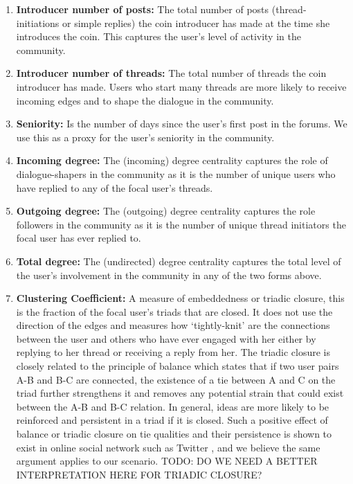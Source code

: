 \begin{enumerate}[topsep=0pt,itemsep=-0.5ex,partopsep=1ex,parsep=1ex]
  \item \textbf{Introducer number of posts:} The total number of posts (thread-initiations or simple replies) the coin introducer has made at the time she introduces the coin. This captures the user's level of activity in the community.
  \item \textbf{Introducer number of threads:} The total number of threads the coin introducer has made. Users who start many threads are more likely to receive incoming edges and to shape the dialogue in the community.
  \item \textbf{Seniority:} Is the number of days since the user's first post in the forums. We use this as a proxy for the user's seniority in the community.
  \item \textbf{Incoming degree:} The (incoming) degree centrality captures the role of dialogue-shapers in the community as it is the number of unique users who have replied to any of the focal user's threads.
  \item \textbf{Outgoing degree:} The (outgoing) degree centrality captures the role followers in the community as it is the number of unique thread initiators the focal user has ever replied to.
  \item \textbf{Total degree:} The (undirected) degree centrality captures the total level of the user's involvement in the community in any of the two forms above.
  \item \textbf{Clustering Coefficient:} A measure of embeddedness or triadic closure, this is the fraction of the focal user's triads that are closed. It does not use the direction of the edges and measures how `tightly-knit' are the connections between the user and others who have ever engaged with her either by replying to her thread or receiving a reply from her. The triadic closure is closely related to the principle of balance which states that if two user pairs A-B and B-C are connected, the existence of a tie between A and C on the triad further strengthens it and removes any potential strain that could exist between the A-B and B-C relation. In general, ideas are more likely to be reinforced and persistent in a triad if it is closed. Such a positive effect of balance or triadic closure on tie qualities and their persistence is shown to exist in online social network such as Twitter \cite{KleinbergBalance}, and we believe the same argument applies to our scenario.
  TODO: DO WE NEED A BETTER INTERPRETATION HERE FOR TRIADIC CLOSURE?

\end{enumerate}
